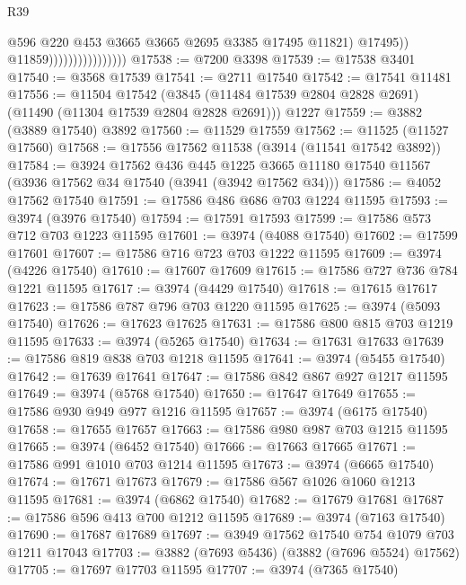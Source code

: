 \begin{lexlean}{R39}
\begin{coremodule}
                                          @596
                                          @220
                                          @453
                                          @3665
                                          @3665
                                          @2695
                                          @3385
                                          @17495
                                          @11821)
                                        @17495))
                                    @11859))))))))))))))))
@17538 := @7200 @3398
@17539 := @17538 @3401
@17540 := @3568 @17539
@17541 := @2711 @17540
@17542 := @17541 @11481
@17556 := @11504
    @17542
    (@3845 (@11484 @17539 @2804 @2828 @2691) (@11490 (@11304 @17539 @2804 @2828 @2691)))
    @1227
@17559 := @3882 (@3889 @17540) @3892
@17560 := @11529 @17559
@17562 := @11525 (@11527 @17560)
@17568 := @17556 @17562 @11538 (@3914 (@11541 @17542 @3892))
@17584 := @3924
    @17562
    @436
    @445
    @1225
    @3665
    @11180
    @17540
    @11567
    (@3936 @17562 @34 @17540 (@3941 (@3942 @17562 @34)))
@17586 := @4052 @17562 @17540
@17591 := @17586 @486 @686 @703 @1224 @11595
@17593 := @3974 (@3976 @17540)
@17594 := @17591 @17593
@17599 := @17586 @573 @712 @703 @1223 @11595
@17601 := @3974 (@4088 @17540)
@17602 := @17599 @17601
@17607 := @17586 @716 @723 @703 @1222 @11595
@17609 := @3974 (@4226 @17540)
@17610 := @17607 @17609
@17615 := @17586 @727 @736 @784 @1221 @11595
@17617 := @3974 (@4429 @17540)
@17618 := @17615 @17617
@17623 := @17586 @787 @796 @703 @1220 @11595
@17625 := @3974 (@5093 @17540)
@17626 := @17623 @17625
@17631 := @17586 @800 @815 @703 @1219 @11595
@17633 := @3974 (@5265 @17540)
@17634 := @17631 @17633
@17639 := @17586 @819 @838 @703 @1218 @11595
@17641 := @3974 (@5455 @17540)
@17642 := @17639 @17641
@17647 := @17586 @842 @867 @927 @1217 @11595
@17649 := @3974 (@5768 @17540)
@17650 := @17647 @17649
@17655 := @17586 @930 @949 @977 @1216 @11595
@17657 := @3974 (@6175 @17540)
@17658 := @17655 @17657
@17663 := @17586 @980 @987 @703 @1215 @11595
@17665 := @3974 (@6452 @17540)
@17666 := @17663 @17665
@17671 := @17586 @991 @1010 @703 @1214 @11595
@17673 := @3974 (@6665 @17540)
@17674 := @17671 @17673
@17679 := @17586 @567 @1026 @1060 @1213 @11595
@17681 := @3974 (@6862 @17540)
@17682 := @17679 @17681
@17687 := @17586 @596 @413 @700 @1212 @11595
@17689 := @3974 (@7163 @17540)
@17690 := @17687 @17689
@17697 := @3949 @17562 @17540 @754 @1079 @703 @1211 @17043
@17703 := @3882 (@7693 @5436) (@3882 (@7696 @5524) @17562)
@17705 := @17697 @17703 @11595
@17707 := @3974 (@7365 @17540)

\end{coremodule}
\end{lexlean}
